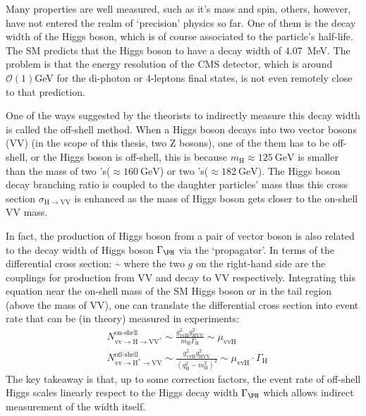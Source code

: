 Many properties are well measured, such as it's mass and spin\cite{cms_higgs}, others, however,
have not entered the realm of `precision' physics so far. One of them is the decay width of
the Higgs boson, which is of course associated to the particle's half-life. The SM predicts
that the Higgs boson to have a decay width of \SI{4.07}{\mega\electronvolt}. The problem is
that the energy resolution of the CMS detector, which is around $\mathcal{O}(1)$\si{\giga\electronvolt}
for the di-photon or 4-leptons final states, is not even remotely close to that prediction.

One of the ways suggested by the theorists\cite{offshell_theory1, offshell_theory2} 
to indirectly measure this decay width is called the
off-shell method. When a Higgs boson decays into two vector bosons (VV) (in the scope of this thesis, two Z bosons),
one of the them has to be off-shell, or the Higgs boson is off-shell, this is because
$m_\text{H}\approx\SI{125}{\giga\electronvolt}$ is smaller than the 
mass of two \PW{}'s($\approx\SI{160}{\giga\electronvolt}$) 
or two \PZ{}'s($\approx\SI{182}{\giga\electronvolt}$). The Higgs boson decay branching ratio
is coupled to the daughter particles' mass thus this cross section
$\sigma_{\mathrm{H}\rightarrow\mathrm{VV}}$ is enhanced as the mass of Higgs boson gets closer to 
the on-shell VV mass.  

In fact, the production of Higgs boson from a pair of vector boson is also related to the
decay width of Higgs boson $\Gamma_\text{\PH}$ via the `propagator'\cite{offshell_poc}. In terms of the
differential cross section:
\be
\label{eqn:diff_xsec}
\sim 
{}
\ee
where the two $g$ on the right-hand side are the couplings for production from VV and decay
to VV respectively. Integrating this equation near the on-shell mass of the SM Higgs boson 
or in the tail region (above the mass of VV), one can translate the differential cross section
into event rate that can be (in theory) measured in experiments:
\begin{equation}
\begin{split}
&N_{\mathrm{vv} \rightarrow \mathrm{H} \rightarrow \mathrm{VV}^{*}}^{\text{on-shell}} \sim \frac{g_{\mathrm{vvH}}^{2} g_{\mathrm{HVV}}^{2}}{m_{\mathrm{H}} \Gamma_{\mathrm{H}}} \sim \mu_{\mathrm{vvH}}
\\
&N_{\mathrm{vv} \rightarrow \mathrm{H}^{*} \rightarrow \mathrm{VV}}^{\text{off-shell}} \sim \frac{g_{\mathrm{vvH}}^{2} g_{\mathrm{HVV}}^{2}}{\left(q_{\mathrm{H}}^{2}-m_{\mathrm{H}}^{2}\right)^{2}} \sim \mu_{\mathrm{vvH}} \cdot \Gamma_{\mathrm{H}}
\end{split}
\end{equation}
The key takeaway is that, up to some correction factors, the event rate of off-shell Higgs scales
linearly respect to the Higgs decay width $\Gamma_\text{\PH}$ which allows indirect
measurement of the width itself.

